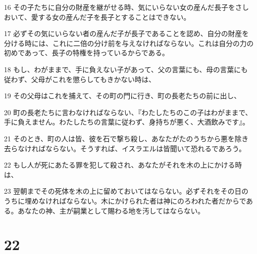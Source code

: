 \par 16 その子たちに自分の財産を継がせる時、気にいらない女の産んだ長子をさしおいて、愛する女の産んだ子を長子とすることはできない。
\par 17 必ずその気にいらない者の産んだ子が長子であることを認め、自分の財産を分ける時には、これに二倍の分け前を与えなければならない。これは自分の力の初めであって、長子の特権を持っているからである。
\par 18 もし、わがままで、手に負えない子があって、父の言葉にも、母の言葉にも従わず、父母がこれを懲らしてもきかない時は、
\par 19 その父母はこれを捕えて、その町の門に行き、町の長老たちの前に出し、
\par 20 町の長老たちに言わなければならない、『わたしたちのこの子はわがままで、手に負えません。わたしたちの言葉に従わず、身持ちが悪く、大酒飲みです』。
\par 21 そのとき、町の人は皆、彼を石で撃ち殺し、あなたがたのうちから悪を除き去らなければならない。そうすれば、イスラエルは皆聞いて恐れるであろう。
\par 22 もし人が死にあたる罪を犯して殺され、あなたがそれを木の上にかける時は、
\par 23 翌朝までその死体を木の上に留めておいてはならない。必ずそれをその日のうちに埋めなければならない。木にかけられた者は神にのろわれた者だからである。あなたの神、主が嗣業として賜わる地を汚してはならない。

\chapter{22}


